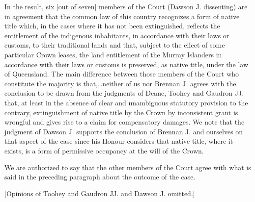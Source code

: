 In the result, six [out of seven] members of the Court (Dawson J. dissenting)
are in agreement that the common law of this country recognizes a form of native
title which, in the cases where it has not been extinguished, reflects the
entitlement of the indigenous inhabitants, in accordance with their laws or
customs, to their traditional lands and that, subject to the effect of some
particular Crown leases, the land entitlement of the Murray Islanders in
accordance with their laws or customs is preserved, as native title, under the
law of Queensland. The main difference between those members of the Court who
constitute the majority is that,\ldots neither of us nor Brennan J. agrees with
the conclusion to be drawn from the judgments of Deane, Toohey and Gaudron JJ.
that, at least in the absence of clear and unambiguous statutory provision to
the contrary, extinguishment of native title by the Crown by inconsistent grant
is wrongful and gives rise to a claim for compensatory damages. We note that the
judgment of Dawson J. supports the conclusion of Brennan J. and ourselves on
that aspect of the case since his Honour considers that native title, where it
exists, is a form of permissive occupancy at the will of the Crown.

We are authorized to say that the other members of the Court agree with what is
said in the preceding paragraph about the outcome of the case.

[Opinions of Toohey and Gaudron JJ. and Dawson J. omitted.]

